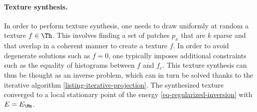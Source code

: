 


\paragraph{Texture synthesis.} 
In order to perform texture synthesis, one needs to draw uniformly at random a texture $f \in \Th$. This involves finding a set of patches $p_x$ that are $k$ sparse and that overlap in a coherent manner to create a texture $f$. In order to avoid degenerate solutions such as $f=0$, one typically imposes additional constraints such as the equality of histograms between $f$ and $f_e$. This texture synthesis can thus be thought as an inverse problem, which can in turn be solved thanks to the iterative algorithm \ref{listing-iterative-projection}. The synthesized texture converged to a local stationary point of the energy \ref{eq-regularized-inversion} with $E=E_{\Mm}$.



